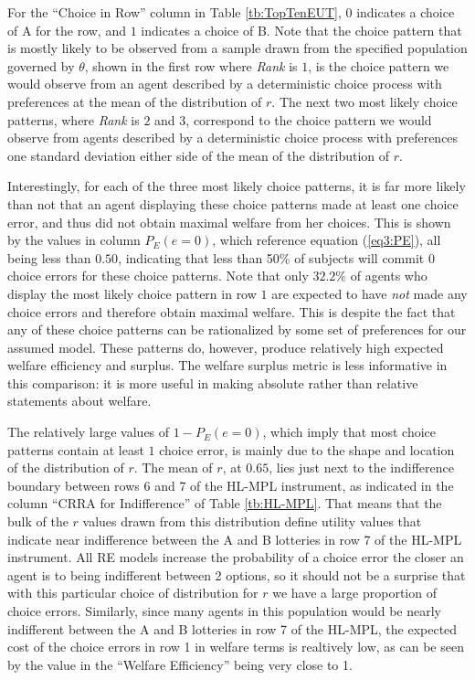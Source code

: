 \documentclass[../main.tex]{subfiles}
\begin{document}
For the \enquote{Choice in Row} column in Table \ref{tb:TopTenEUT}, $0$ indicates a choice of A for the row, and $1$ indicates a choice of B.
Note that the choice pattern that is mostly likely to be observed from a sample drawn from the specified population governed by $\theta$, shown in the first row where \textit{Rank} is $1$, is the choice pattern we would observe from an agent described by a deterministic choice process with preferences at the mean of the distribution of $r$.
The next two most likely choice patterns, where \textit{Rank} is $2$ and $3$, correspond to the choice pattern we would observe from agents described by a deterministic choice process with preferences one standard deviation either side of the mean of the distribution of $r$.

Interestingly, for each of the three most likely choice patterns, it is far more likely than not that an agent displaying these choice patterns made at least one choice error, and thus did not obtain maximal welfare from her choices.
This is shown by the values in column $P_E(e=0)$, which reference equation (\ref{eq3:PE}), all being less than $0.50$, indicating that less than 50\% of subjects will commit 0 choice errors for these choice patterns.
Note that only $32.2\%$ of agents who display the most likely choice pattern in row $1$ are expected to have \textit{not} made any choice errors and therefore obtain maximal welfare.
This is despite the fact that any of these choice patterns can be rationalized by some set of preferences for our assumed model.
These patterns do, however, produce relatively high expected welfare efficiency and surplus.
The welfare surplus metric is less informative in this comparison: it is more useful in making absolute rather than relative statements about welfare.

The relatively large values of $ 1 - P_E(e = 0)$, which imply that most choice patterns contain at least $1$ choice error, is mainly due to the shape and location of the distribution of $r$.
The mean of $r$, at $0.65$, lies just next to the indifference boundary between rows 6 and 7 of the HL-MPL instrument, as indicated in the column \enquote{CRRA for Indifference} of Table \ref{tb:HL-MPL}.
That means that the bulk of the $r$ values drawn from this distribution define utility values that indicate near indifference between the A and B lotteries in row 7 of the HL-MPL instrument.
All RE models increase the probability of a choice error the closer an agent is to being indifferent between 2 options, so it should not be a surprise that with this particular choice of distribution for $r$ we have a large proportion of choice errors.
Similarly, since many agents in this population would be nearly indifferent between the A and B lotteries in row 7 of the HL-MPL, the expected cost of the choice errors in row 1 in welfare terms is realtively low, as can be seen by the value in the \enquote{Welfare Efficiency} being very close to 1.
\end{document}
